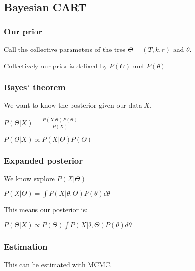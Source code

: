 
\subsection{Bayesian CART}

\subsubsection{Our prior}

Call the collective parameters of the tree \(\Theta =(T, k, r)\) and \(\theta \).

Collectively our prior is defined by \(P(\Theta )\) and \(P(\theta )\)

\subsubsection{Bayes' theorem}

We want to know the posterior given our data \(X\).

\(P(\Theta | X)=\frac{P(X|\Theta )P(\Theta )}{P(X)}\)

\(P(\Theta | X)\propto P(X|\Theta )P(\Theta )\)

\subsubsection{Expanded posterior}

We know explore \(P(X|\Theta )\)

\(P(X|\Theta )=\int P(X| \theta , \Theta)P(\theta)d\theta \)

This means our posterior is:

\(P(\Theta | X)\propto P(\Theta )\int P(X| \theta , \Theta)P(\theta)d\theta \)

\subsubsection{Estimation}

This can be estimated with MCMC.

